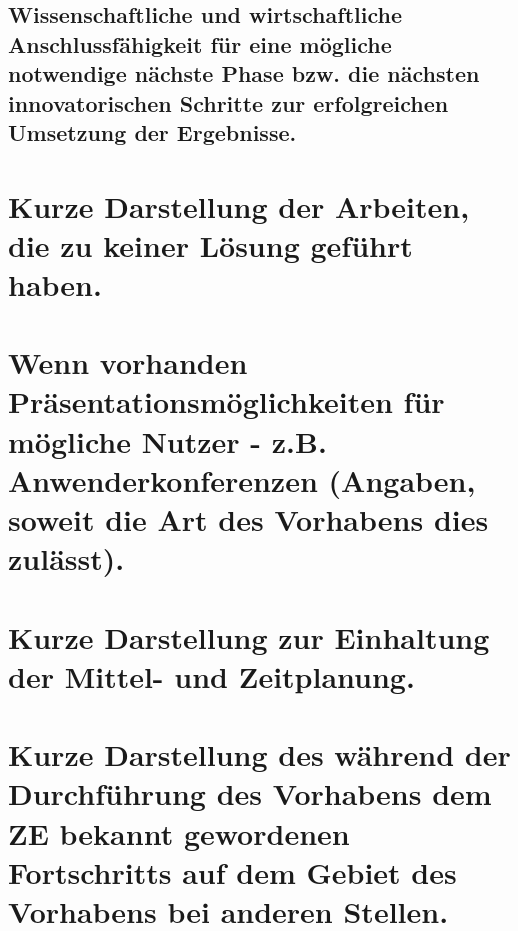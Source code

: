 \subsection{Wissenschaftliche und wirtschaftliche Anschlussfähigkeit für eine mögliche notwendige nächste Phase bzw. die nächsten innovatorischen Schritte zur erfolgreichen Umsetzung der Ergebnisse.}

\section{Kurze Darstellung der Arbeiten, die zu keiner Lösung geführt haben.}

\section{Wenn vorhanden Präsentationsmöglichkeiten für mögliche Nutzer - z.B. Anwenderkonferenzen (Angaben, soweit die Art des Vorhabens dies zulässt).}

\section{Kurze Darstellung zur Einhaltung der Mittel- und Zeitplanung.}

\section{Kurze Darstellung des während der Durchführung des Vorhabens dem ZE bekannt gewordenen Fortschritts auf dem Gebiet des Vorhabens bei anderen Stellen.}

\renewcommand{\bibsection}{\section{Auflistung der erfolgten oder geplanten Veröffentlichungen des Ergebnisses.}}
\nocite{*}




